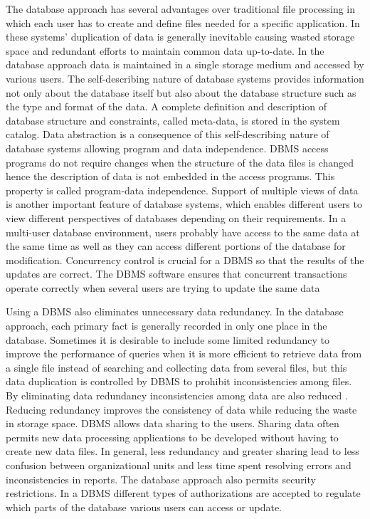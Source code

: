 The database approach has several advantages over traditional file processing
in which each user has to create and define files needed for a specific application.
In these systems' duplication of data is generally inevitable causing wasted storage
space and redundant efforts to maintain common data up-to-date. In the database
approach data is maintained in a single storage medium and accessed by various
users. The self-describing nature of database systems provides information not
only about the database itself but also about the database structure such as the type and
format of the data. A complete definition and description of database structure and
constraints, called meta-data, is stored in the system catalog. Data abstraction is a
consequence of this self-describing nature of database systems allowing program and data independence.
DBMS access programs do not require changes when the structure of the data files is changed hence
the description of data is not embedded in the access programs. This property is called program-data
independence. Support of multiple views of data is another important feature of
database systems, which enables different users to view different perspectives of
databases depending on their requirements. In a multi-user database environment,
users probably have access to the same data at the same time as well as they can
access different portions of the database for modification. Concurrency control is
crucial for a DBMS so that the results of the updates are correct. The DBMS
software ensures that concurrent transactions operate correctly when several
users are trying to update the same data

Using a DBMS also eliminates unnecessary data redundancy. In the database
approach, each primary fact is generally recorded in only one place in the database.
Sometimes it is desirable to include some limited redundancy to improve the
performance of queries when it is more efficient to retrieve data from a single file
instead of searching and collecting data from several files, but this data duplication
is controlled by DBMS to prohibit inconsistencies among files. By
eliminating data redundancy inconsistencies among data are also reduced \cite{elmasri1998}.
Reducing redundancy improves the consistency of data while reducing the waste
in storage space. DBMS allows data sharing to the users. Sharing
data often permits new data processing applications to be developed without
having to create new data files. In general, less redundancy and greater sharing
lead to less confusion between organizational units and less time spent resolving
errors and inconsistencies in reports. The database approach also permits security
restrictions. In a DBMS different types of authorizations are accepted to
regulate which parts of the database various users can access or update.